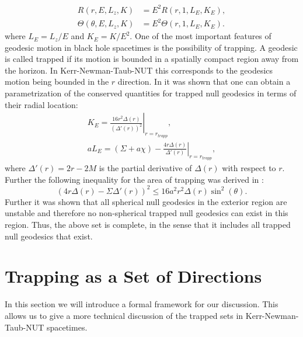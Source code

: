 \documentclass[reqno]{amsart}
\numberwithin{equation}{section}
\theoremstyle{plain}
\theoremstyle{definition}
\begin{document}
\begin{align}
R(r,E,L_z,K)&=E ^2 R(r,1,L_E,K_E),\\
\Theta (\theta, E, L_z, K)& =E ^2 \Theta(r,1,L_E,K_E).
\end{align} 
where $L_E=L_z/E$ and $K_E=K/E^2$.
One of the most important features of geodesic motion in black hole spacetimes is the possibility of trapping. A geodesic is called trapped if its motion is bounded in a spatially compact region away from the horizon. In Kerr-Newman-Taub-NUT this corresponds to the geodesics motion being bounded in the $r$ direction. In \cite{grenzebach_photon_2014} it was shown that one can obtain a parametrization of the conserved quantities for trapped null geodesics in terms of their radial location:
\begin{subequations}\label{eq:altcomtrap}
\begin{align}
K_E=\left.\frac{16 r^2 \Delta(r)}{(\Delta'(r))^2}\right|_{r=r_{trapp}},\\
aL_E=\left.(\Sigma +a \chi)-\frac{4r \Delta(r)}{\Delta'(r)}\right|_{r=r_{trapp}},
\end{align}
\end{subequations}
where $ \Delta'(r)=2 r - 2 M  $ is the partial derivative of $\Delta(r)$ with respect to $r$. Further the following inequality for the area of trapping was derived in \cite{grenzebach_photon_2014}:
\begin{equation}\label{eq:areaoftrapp}
(4r\Delta(r)-\Sigma \Delta'(r))^2\leq 16 a^2r^2\Delta(r)\sin^2(\theta). 
\end{equation}
Further it was shown that all spherical null geodesics in the exterior region are unstable and therefore no non-spherical trapped null geodesics can exist in this region. Thus, the above set is complete, in the sense that it includes all trapped null geodesics that exist. 


\section{Trapping as a Set of Directions}\label{sec:sphere}
 In this section we will  introduce a formal framework for our discussion. This allows us to give a more technical discussion of the trapped sets in Kerr-Newman-Taub-NUT spacetimes. 
\end{document}
